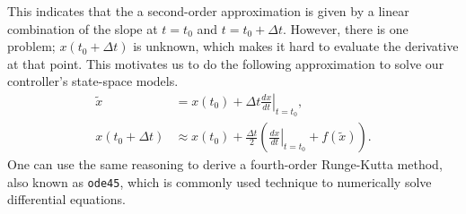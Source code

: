 \documentclass[11pt,titlepage]{report}
\begin{document}
This indicates that the a second-order approximation is given by a linear combination of the slope at $t=t_0$ and $t=t_0+\Delta t$. However, there is one problem; $x(t_0 + \Delta t)$ is unknown, which makes it hard to evaluate the derivative at that point. This motivates us to do the following approximation to solve our controller's state-space models.
\begin{align}
\tilde{x} &= x(t_0)+ \Delta t \left. \frac{dx}{dt} \right|_{t=t_0}, \nonumber \\
x(t_0+\Delta t) &\approx x(t_0) + \frac{\Delta t}{2}\left(\left. \frac{dx}{dt} \right|_{t=t_0} + f(\tilde{x})\right).\nonumber 
\end{align}
One can use the same reasoning to derive a fourth-order Runge-Kutta method, also known as \texttt{ode45}, which is commonly used technique to numerically solve differential equations.
\end{document}
